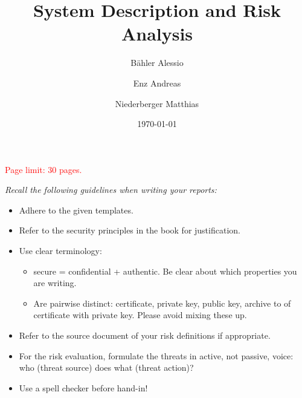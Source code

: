 \documentclass[english]{article}
\date{\today}
\begin{document}
\title{\huge\sffamily\bfseries System Description and Risk Analysis}
\author[1]{B\"ahler Alessio}
\author[1]{Enz Andreas}
\author[1]{Niederberger Matthias}
\maketitle

\begin{center}
{\large\textcolor{red}{Page limit: 30 pages.}}
\end{center}

\tableofcontents
\pagebreak

\begin{framed}
\noindent
{\it
Recall the following guidelines when writing your reports:
\begin{itemize}
\item Adhere to the given templates.

\item Refer to the security principles in the book for justification.

\item Use clear terminology:
\begin{itemize}
\item secure = confidential + authentic. Be clear about
which properties you are writing.
\item Are pairwise distinct: certificate, private key, public key, archive to of certificate with private key. Please avoid mixing these up.
\end{itemize}

\item Refer to the source document of your risk definitions if appropriate.

\item For the risk evaluation, formulate the threats in active, not passive,
voice: who (threat source) does what (threat action)?

\item Use a spell checker before hand-in!

\end{itemize}
}
\end{framed}
\end{document}
